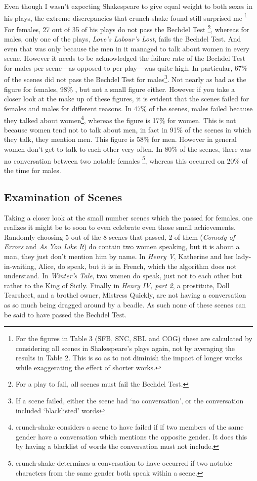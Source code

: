 \documentclass[12pt]{article}
\begin{document}
Even though I wasn't expecting Shakespeare to give equal weight to both sexes
in his plays, the extreme discrepancies that crunch-shake found still surprised
me \footnote{For the figures in Table 3 (SFB, SNC, SBL and COG) these are
calculated by considering all scenes in Shakespeare's plays again, not by
averaging the results in Table 2. This is so as to not diminish the impact of
longer works while exaggerating the effect of shorter works.} For females, 27
out of 35 of his plays do not pass the Bechdel Test \footnote{For a play to
fail, all scenes must fail the Bechdel Test.}, whereas for males, only one of
the plays, \emph{Love's Labour's Lost}, fails the Bechdel Test.  And even that
was only because the men in it managed to talk about women in every scene.
However it needs to be acknowledged the failure rate of the Bechdel Test for
males per scene---as opposed to per play---was quite high. In particular, 67\%
of the scenes did not pass the Bechdel Test for males\footnote{If a scene
failed, either the scene had `no conversation', or the conversation included
`blacklisted' words}.  Not nearly as bad as the figure for females, 98\% , but
not a small figure either. However if you take a closer look at the make up of
these figures, it is evident that the scenes failed for females and males for
different reasons.  In 47\% of the scenes, males failed because they talked
about women\footnote{crunch-shake considers a scene to have failed if if two
members of the same gender have a conversation which mentions the opposite
gender. It does this by having a blacklist of words the conversation must not
include.}, whereas the figure is 17\% for women. This is not because women tend
not to talk about men, in fact in 91\% of the scenes in which they talk, they
mention men. This figure is 58\% for men.  However in general women don't get
to talk to each other very often. In 80\% of the scenes, there was no
conversation between two notable females \footnote{crunch-shake determines a
conversation to have occurred if two notable characters from the same gender
both speak within a scene.}, whereas this occurred on 20\% of the time for
males. 

\subsection{Examination of Scenes}
\label{sub:examination_of_scenes}

Taking a closer look at the small number scenes which the passed for females,
one realizes it might be to soon to even celebrate even those small
achievements.  Randomly choosing 5 out of the 8 scenes that passed, 2 of them
(\emph{Comedy of Errors} and \emph{As You Like It}) do contain two women
speaking, but it is about a man, they just don't mention him by name. In
\emph{Henry V}, Katherine and her lady-in-waiting, Alice, do speak, but it is
in French, which the algorithm does not understand. In \emph{Winter's Tale},
two women do speak, just not to each other but rather to the King of Sicily.
Finally in \emph{Henry IV, part 2}, a prostitute, Doll Tearsheet, and a brothel
owner, Mistress Quickly, are not having a conversation as so much being dragged
around by a beadle. As such none of these scenes can be said to have passed the
Bechdel Test.
\end{document}
